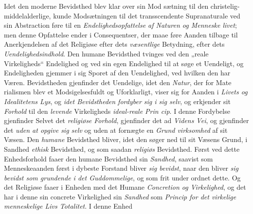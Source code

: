 \begin{enumerate}[label=\arabic*., leftmargin=*, labelsep=1em,
                  topsep=0.35\baselineskip, itemsep=0.35\baselineskip]
  Idet den moderne Bevidsthed blev klar over sin Mod\-%
sætning til den christelig-middelalderlige, kunde Modsætningen til det
  transscendente Supranaturale ved sin Abstraction føre til en
  \emph{Endelighedsopfattelse af Naturen og Menneske\-%
livet}; men denne Opfattelse ender i Consequentser, der maae føre Aanden tilbage
  til Anerkjendelsen af det Religiøse efter dets \emph{væsentlige} Betydning,
  efter dets \emph{Uendelighedsindhold}. Den humane Bevidsthed tvinges ved den
  „reale Virkeligheds“ Endelighed og ved sin egen Endelighed til at søge et
  Uendeligt, og Endeligheden gjemmer i sig Sporet af den Uendelighed, ved hvilken
  den har Væren. Bevidstheden gjenfinder det Uendelige, idet den \emph{Natur},
  der for Mate\-%
rialismen blev et Modsigelsesfuldt og Uforklarligt, viser sig
 for Aanden i \emph{Livets og Idealitetens Lys}, og \emph{idet Bevidstheden
  fordyber sig i sig selv}, og erkjender sit \emph{Forhold} til den
  \emph{levende} Virkeligheds \emph{ideal-reale Prin\-%
cip}. I denne Fordybelse gjenfinder Selvet det \emph{religiøse Forhold},
  gjenfinder det ad \emph{Videns Vei}, og gjenfinder det \emph{uden at opgive sig
  selv} og uden at fornægte en \emph{Grund\-%
virksomhed} af sit Væsen. Den \emph{humane} Bevidsthed bliver, idet den søger ned
  til sit Væsens Grund, i Sandhed \emph{ethisk} Bevidsthed, og som saadan
  \emph{religiøs} Bevidsthed. Først ved dette Enhedsforhold faaer den humane
  Bevidsthed sin \emph{Sandhed}, saavist som Menneskeaanden først i dybeste
  Forstand bliver \emph{sig bevidst}, naar den bliver \emph{sig bevidst som
  grundende i det Guddommelige}, og som frit under\-%
ordnet dette. Og det Religiøse faaer i Enheden med det Humane \emph{Concretion og
  Virkelighed}, og det har i denne sin concrete Virkelighed sin \emph{Sandhed}
  som \emph{Princip for det virkelige menneskelige Livs Totalitet}. I denne Enhed

\end{enumerate}
